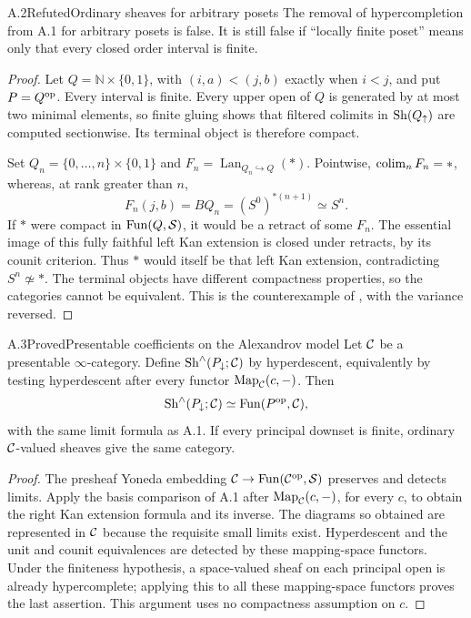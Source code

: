 \begin{statement}{A.2}{Refuted}{Ordinary sheaves for arbitrary posets}
The removal of hypercompletion from A.1 for arbitrary posets is false.
It is still false if ``locally finite poset'' means only that every closed
order interval is finite.
\end{statement}
\begin{proof}
Let $Q=\mathbb N\times\{0,1\}$, with $(i,a)<(j,b)$ exactly when $i<j$,
and put $P=Q^{\mathrm{op}}$. Every interval is finite. Every upper open of $Q$ is
generated by at most two minimal elements, so finite gluing shows that
filtered colimits in $\operatorname{Sh}(Q_{\uparrow})$ are computed sectionwise.
Its terminal object is therefore compact.

Set $Q_n=\{0,\ldots,n\}\times\{0,1\}$ and
$F_n=\operatorname{Lan}_{Q_n\hookrightarrow Q}(*)$. Pointwise,
$\operatorname*{colim}_n F_n=*$, whereas, at rank greater than $n$,
\[
 F_n(j,b)=BQ_n=(S^0)^{*(n+1)}\simeq S^n.
\]
If $*$ were compact in $\operatorname{Fun}(Q,\mathcal S)$, it would be a retract of some
$F_n$. The essential image of this fully faithful left Kan extension is
closed under retracts, by its counit criterion. Thus $*$ would itself be
that left Kan extension, contradicting $S^n\not\simeq *$.
The terminal objects have different compactness properties, so the
categories cannot be equivalent. This is the counterexample of
\citet[Example A.13]{Aoki2023}, with the variance reversed.
\end{proof}

\begin{statement}{A.3}{Proved}{Presentable coefficients on the Alexandrov model}
Let $\mathcal C$ be a presentable $\infty$-category. Define
$\operatorname{Sh}^{\wedge}(P_{\downarrow};\mathcal C)$ by hyperdescent, equivalently by
testing hyperdescent after every functor $\operatorname{Map}_{\mathcal C}(c,-)$.
Then
\[
 \operatorname{Sh}^{\wedge}(P_{\downarrow};\mathcal C)\simeq\operatorname{Fun}(P^{\mathrm{op}},\mathcal C),
\]
with the same limit formula as A.1. If every principal downset is finite,
ordinary $\mathcal C$-valued sheaves give the same category.
\end{statement}
\begin{proof}
The presheaf Yoneda embedding $\mathcal C\to\operatorname{Fun}(\mathcal C^{\mathrm{op}},\mathcal S)$ preserves
and detects limits. Apply the basis comparison of A.1 after
$\operatorname{Map}_{\mathcal C}(c,-)$, for every $c$, to obtain the right Kan extension
formula and its inverse. The diagrams so obtained are represented in
$\mathcal C$ because the requisite small limits exist. Hyperdescent and the
unit and counit equivalences are detected by these mapping-space
functors. Under the finiteness hypothesis, a space-valued sheaf on each
principal open is already hypercomplete; applying this to all these
mapping-space functors proves the last assertion. This argument uses
no compactness assumption on $c$.
\end{proof}

